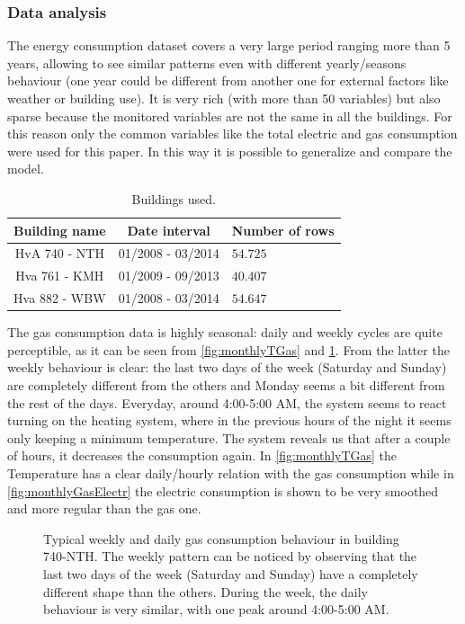 \documentclass{sig-alternate-sigmod07}
\begin{document}
\subsubsection{Data analysis}
\label{sec:dataAnalysis}

The energy consumption dataset covers a very large period ranging more than 5 years, allowing to see similar patterns even with different yearly/seasons behaviour (one year could be different from another one for external factors like weather or building use). It is very rich (with more than 50 variables) but also sparse because the monitored variables are not the same in all the buildings. For this reason only the common variables like the total electric and gas consumption were used for this paper. In this way it is possible to generalize and compare the model. 

\begin{table}
\centering
\label{tab:dataset}
\begin{tabular}{|c|c|l|} \hline
Building name&Date interval&Number of rows\\ \hline\hline
HvA 740 - NTH & 01/2008 - 03/2014 & $54.725$\\ \hline
Hva 761 - KMH & 01/2009 - 09/2013 & $40.407$\\ \hline
Hva 882 - WBW& 01/2008 - 03/2014 & $54.647$\\ \hline
\end{tabular}
\caption{Buildings used.}
\end{table}

The gas consumption data is highly seasonal: daily and weekly cycles are quite perceptible, as it can be seen from \cref{fig:monthlyTGas} and \cref{fig:dailyBehaviour}. From the latter the weekly behaviour is clear: the last two days of the week (Saturday and Sunday) are completely different from the others and Monday seems a bit different from the rest of the days. Everyday, around 4:00-5:00 AM, the system seems to react turning on the heating system, where in the previous hours of the night it seems only keeping a minimum temperature. The system reveals us that after a couple of hours, it decreases the consumption again.
In \cref{fig:monthlyTGas} the Temperature has a clear daily/hourly relation with the gas consumption while in \cref{fig:monthlyGasElectr} the electric consumption is shown to be very smoothed and more regular than the gas one.


\begin{figure}[h!]
\centering
{}
\caption{Typical weekly and daily gas consumption behaviour in building 740-NTH. The weekly pattern can be noticed by observing that the last two days of the week (Saturday and Sunday) have a completely different shape than the others. During the week, the daily behaviour is very similar, with one peak around 4:00-5:00 AM.}
\label{fig:dailyBehaviour}
\end{figure}
\end{document}
